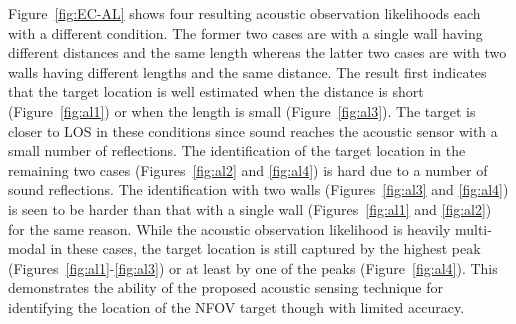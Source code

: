 	
Figure~\ref{fig:EC-AL} shows four resulting acoustic observation likelihoods each with a different condition.  The former two cases are with a single wall having different distances and the same length whereas the latter two cases are with two walls having different lengths and the same distance.  The result first indicates that the target location is well estimated when the distance is short (Figure~\ref{fig:al1}) or when the length is small (Figure~\ref{fig:al3}).  The target is closer to LOS in these conditions since sound reaches the acoustic sensor with a small number of reflections.  The identification of the target location in the remaining two cases (Figures~\ref{fig:al2} and \ref{fig:al4}) is hard due to a number of sound reflections.  The identification with two walls (Figures~\ref{fig:al3} and \ref{fig:al4}) is seen to be harder than that with a single wall (Figures~\ref{fig:al1} and \ref{fig:al2}) for the same reason.  While the acoustic observation likelihood is heavily multi-modal in these cases, the target location is still captured by the highest peak (Figures~\ref{fig:al1}-\ref{fig:al3}) or at least by one of the peaks (Figure~\ref{fig:al4}).  This demonstrates the ability of the proposed acoustic sensing technique for identifying the location of the NFOV target though with limited accuracy.  
